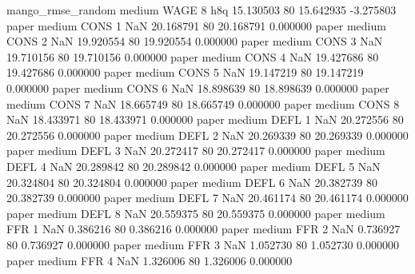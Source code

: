 mango_rmse_random     medium     WAGE                 8                  h8q 15.130503 80      15.642935          -3.275803
            paper     medium     CONS                 1                  NaN 20.168791 80      20.168791           0.000000
            paper     medium     CONS                 2                  NaN 19.920554 80      19.920554           0.000000
            paper     medium     CONS                 3                  NaN 19.710156 80      19.710156           0.000000
            paper     medium     CONS                 4                  NaN 19.427686 80      19.427686           0.000000
            paper     medium     CONS                 5                  NaN 19.147219 80      19.147219           0.000000
            paper     medium     CONS                 6                  NaN 18.898639 80      18.898639           0.000000
            paper     medium     CONS                 7                  NaN 18.665749 80      18.665749           0.000000
            paper     medium     CONS                 8                  NaN 18.433971 80      18.433971           0.000000
            paper     medium     DEFL                 1                  NaN 20.272556 80      20.272556           0.000000
            paper     medium     DEFL                 2                  NaN 20.269339 80      20.269339           0.000000
            paper     medium     DEFL                 3                  NaN 20.272417 80      20.272417           0.000000
            paper     medium     DEFL                 4                  NaN 20.289842 80      20.289842           0.000000
            paper     medium     DEFL                 5                  NaN 20.324804 80      20.324804           0.000000
            paper     medium     DEFL                 6                  NaN 20.382739 80      20.382739           0.000000
            paper     medium     DEFL                 7                  NaN 20.461174 80      20.461174           0.000000
            paper     medium     DEFL                 8                  NaN 20.559375 80      20.559375           0.000000
            paper     medium      FFR                 1                  NaN  0.386216 80       0.386216           0.000000
            paper     medium      FFR                 2                  NaN  0.736927 80       0.736927           0.000000
            paper     medium      FFR                 3                  NaN  1.052730 80       1.052730           0.000000
            paper     medium      FFR                 4                  NaN  1.326006 80       1.326006           0.000000
